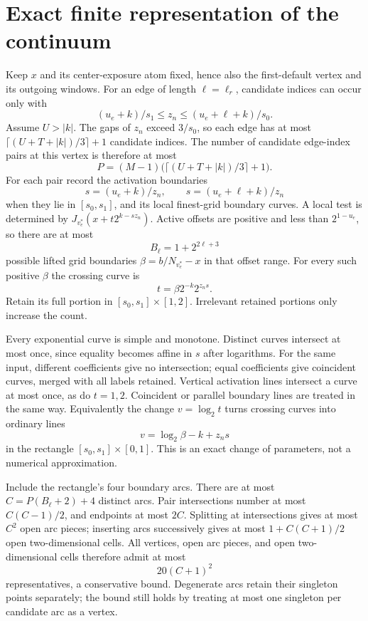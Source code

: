\documentclass[11pt,letterpaper]{article}
\newcommand{\logtwo}{\log_2}
\begin{document}
\section{Exact finite representation of the continuum}
Keep $x$ and its center-exposure atom fixed, hence also the first-default vertex
and its outgoing windows. For an edge of length $\ell=\ell_r$, candidate indices
can occur only with
\[
 (u_e+k)/s_1\le z_n\le(u_e+\ell+k)/s_0.
\]
Assume $U>|k|$. The gaps of $z_n$ exceed $3/s_0$, so each edge has at most
$\lceil(U+T+|k|)/3\rceil+1$ candidate indices. The number of candidate
edge-index pairs at this vertex is therefore at most
\[
 P=(M-1)\bigl(\lceil(U+T+|k|)/3\rceil+1\bigr).
\]
For each pair record the activation boundaries
\[
 s=(u_e+k)/z_n,\qquad s=(u_e+\ell+k)/z_n
\]
when they lie in $[s_0,s_1]$, and its local finest-grid boundary curves. A local
test is determined by $J_{v_e^*}(x+t2^{k-sz_n})$. Active offsets are positive
and less than $2^{1-u_e}$, so there are at most
\[
 B_\ell=1+2^{2\ell+3}
\]
possible lifted grid boundaries $\beta=b/N_{v_e^*}-x$ in that offset range.
For every such positive $\beta$ the crossing curve is
\[
 t=\beta2^{-k}2^{z_ns}.
\]
Retain its full portion in $[s_0,s_1]\times[1,2]$. Irrelevant retained portions
only increase the count.

Every exponential curve is simple and monotone. Distinct curves intersect at
most once, since equality becomes affine in $s$ after logarithms. For the same
input, different coefficients give no intersection; equal coefficients give
coincident curves, merged with all labels retained. Vertical activation lines
intersect a curve at most once, as do $t=1,2$. Coincident or parallel boundary
lines are treated in the same way. Equivalently the change $v=\logtwo t$ turns
crossing curves into ordinary lines
\[
 v=\logtwo\beta-k+z_ns
\]
in the rectangle $[s_0,s_1]\times[0,1]$. This is an exact change of parameters,
not a numerical approximation.

Include the rectangle's four boundary arcs. There are at most
$C=P(B_\ell+2)+4$ distinct arcs. Pair intersections number at most
$C(C-1)/2$, and endpoints at most $2C$. Splitting at intersections gives at most
$C^2$ open arc pieces; inserting arcs successively gives at most
$1+C(C+1)/2$ open two-dimensional cells. All vertices, open arc pieces, and
open two-dimensional cells therefore admit at most
\[
 20(C+1)^2
\]
representatives, a conservative bound. Degenerate arcs retain their singleton
points separately; the bound still holds by treating at most one singleton
per candidate arc as a vertex.
\end{document}
